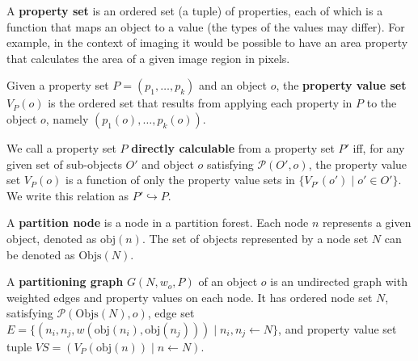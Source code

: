 \begin{definition}
A \textbf{property set} is an ordered set (a tuple) of properties, each of which is a function that maps an object to a value (the types of the values may differ). For example, in the context of imaging it would be possible to have an area property that calculates the area of a given image region in pixels.
\end{definition}

\begin{definition}
Given a property set $P = (p_1,\ldots,p_k)$ and an object $o$, the \textbf{property value set} $V_P(o)$ is the ordered set that results from applying each property in $P$ to the object $o$, namely $(p_1(o),\ldots,p_k(o))$.
\end{definition}

\begin{definition}
We call a property set $P$ \textbf{directly calculable} from a property set $P'$ iff, for any given set of sub-objects $O'$ and object $o$ satisfying $\mathcal{P}(O',o)$, the property value set $V_P(o)$ is a function of only the property value sets in $\{V_{P'}(o') \; | \; o' \in O'\}$. We write this relation as $P' \hookrightarrow P$.
\end{definition}

\begin{definition}
A \textbf{partition node} is a node in a partition forest. Each node $n$ represents a given object, denoted as $\mbox{obj}(n)$. The set of objects represented by a node set $N$ can be denoted as $\mbox{Objs}(N)$.
\end{definition}

\begin{definition}
A \textbf{partitioning graph} $G(N,w_o,P)$ of an object $o$ is an undirected graph with weighted edges and property values on each node. It has ordered node set $N$, satisfying $\mathcal{P}(\mbox{Objs}(N),o)$, edge set $E = \{(n_i,n_j,w(\mbox{obj}(n_i),\mbox{obj}(n_j))) \; | \; n_i, n_j \leftarrow N\}$, and property value set tuple $\textit{VS} = (V_P(\mbox{obj}(n)) \; | \; n \leftarrow N)$.
\end{definition}

